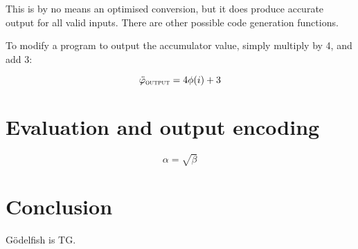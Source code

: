 \documentclass{article}
\begin{document}
This is by no means an optimised conversion, but it does produce accurate output for all valid inputs.
There are other possible code generation functions.


To modify a program to output the accumulator value, simply multiply by 4, and add 3:

\[
	\ddot{\varphi}_{\textsc{output}} = 4\phi(i) + 3
\]

\section{Evaluation and output encoding}


\begin{equation}
    \label{simple_equation}
    \alpha = \sqrt{ \beta }
\end{equation}


\section{Conclusion}
Gödelfish is TG.
\end{document}
